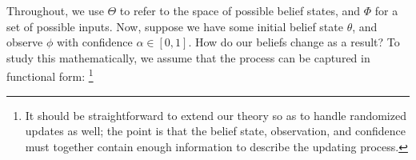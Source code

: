
Throughout, we use $\Theta$ to refer to the space of possible belief states,
and $\Phi$ for a set of possible inputs. 
%
Now, suppose we have some initial belief state $\theta$, and observe $\phi$ with confidence $\alpha \in [0,1]$. 
How do our beliefs change as a result? 
To study this mathematically, we assume that the process can be captured in functional form:
\unskip\footnote{%
	It should be straightforward to extend our theory
	so as to handle randomized updates as well;
	the point is that
	the belief state, observation, and confidence must together contain
	enough information to describe the updating process.
	}

